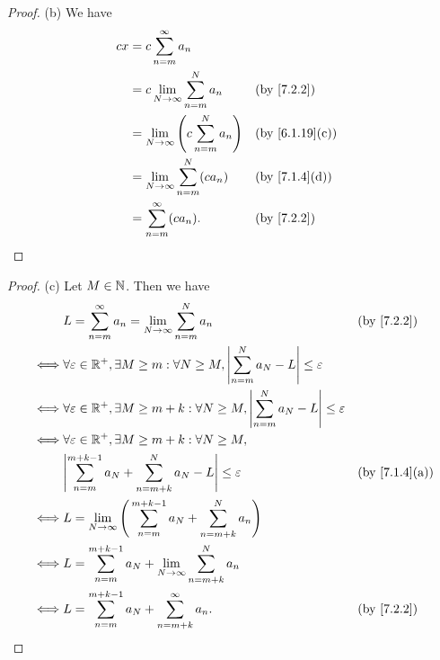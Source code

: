 \begin{proof}{(b)}
  We have
  \begin{align*}
    cx & = c \sum_{n = m}^\infty a_n                                                              \\
       & = c \lim_{N \to \infty} \sum_{n = m}^N a_n             &  & \by{7.2.2}                   \\
       & = \lim_{N \to \infty} \Bigg(c \sum_{n = m}^N a_n\Bigg) &  & \text{(by \cref{6.1.19}(c))} \\
       & = \lim_{N \to \infty} \sum_{n = m}^N (c a_n)           &  & \text{(by \cref{7.1.4}(d))}  \\
       & = \sum_{n = m}^\infty (c a_n).                         &  & \by{7.2.2}
  \end{align*}
\end{proof}

\begin{proof}{(c)}
  Let \(M \in \mathbb{N}\).
  Then we have
  \begin{align*}
         & L = \sum_{n = m}^\infty a_n = \lim_{N \to \infty} \sum_{n = m}^N a_n                                                 &  & \by{7.2.2}                  \\
    \iff & \forall \varepsilon \in \R^+, \exists M \geq m : \forall N \geq M, \abs{\sum_{n = m}^N a_N - L} \leq \varepsilon                                      \\
    \iff & \forall \varepsilon \in \R^+, \exists M \geq m + k : \forall N \geq M, \abs{\sum_{n = m}^N a_N - L} \leq \varepsilon                                  \\
    \iff & \forall \varepsilon \in \R^+, \exists M \geq m + k : \forall N \geq M,                                                                                \\
         & \abs{\sum_{n = m}^{m + k - 1} a_N + \sum_{n = m + k}^N a_N - L} \leq \varepsilon                                     &  & \text{(by \cref{7.1.4}(a))} \\
    \iff & L = \lim_{N \to \infty} \Bigg(\sum_{n = m}^{m + k - 1} a_N + \sum_{n = m + k}^N a_n\Bigg)                                                             \\
    \iff & L = \sum_{n = m}^{m + k - 1} a_N + \lim_{N \to \infty} \sum_{n = m + k}^N a_n                                                                         \\
    \iff & L = \sum_{n = m}^{m + k - 1} a_N + \sum_{n = m + k}^\infty a_n.                                                      &  & \by{7.2.2}
  \end{align*}
\end{proof}

